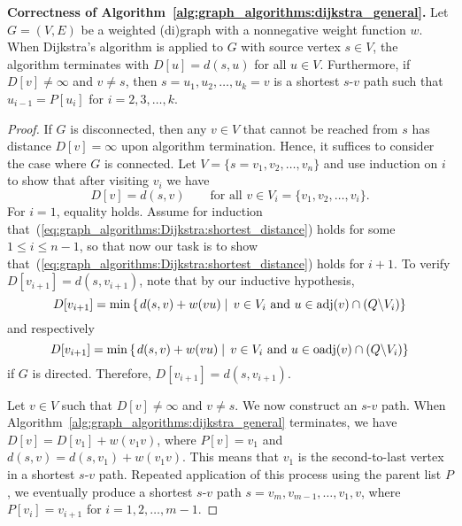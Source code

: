 \begin{theorem}
\textbf{Correctness of
  Algorithm~\ref{alg:graph_algorithms:dijkstra_general}.}
Let $G = (V, E)$ be a weighted (di)graph with a nonnegative weight
function $w$. When Dijkstra's algorithm is applied to $G$ with source
vertex $s \in V$, the algorithm terminates with $D[u] = d(s,u)$ for
all $u \in V$. Furthermore, if $D[v] \neq \infty$ and $v \neq s$, then
$s=u_1, u_2, \dots, u_k = v$ is a shortest $s$-$v$ path such that 
$u_{i-1} = P[u_i]$ for $i = 2,3,\dots,k$.
\end{theorem}

\begin{proof}
If $G$ is disconnected, then any $v \in V$ that cannot be reached from
$s$ has distance $D[v] = \infty$ upon algorithm termination. Hence, it
suffices to consider the case where $G$ is connected. Let 
$V = \{s=v_1, v_2, \dots, v_n\}$ and use induction on $i$ to show that
after visiting $v_i$ we have
%
\begin{equation}
\label{eq:graph_algorithms:Dijkstra:shortest_distance}
D[v]
=
d(s,v)
\qquad
\text{for all $v \in V_i = \{v_1, v_2, \dots, v_i\}$}.
\end{equation}
%
For $i = 1$, equality holds. Assume for induction
that~(\ref{eq:graph_algorithms:Dijkstra:shortest_distance}) holds for
some $1 \leq i \leq n - 1$, so that now our task is to show
that~(\ref{eq:graph_algorithms:Dijkstra:shortest_distance}) holds for
$i + 1$. To verify $D[v_{i+1}] = d(s, v_{i+1})$, note that by our
inductive hypothesis,
\[
D[v_{i+1}]
=
\min \left\{
\left. d(s,v) + w(vu) \;\right|\;
v \in V_i \text{ and } u \in \operatorname*{adj}(v) \cap (Q \backslash V_i)
\right\}
\]
and respectively
\[
D[v_{i+1}]
=
\min \left\{
\left. d(s,v) + w(vu) \;\right|\;
v \in V_i \text{ and } u \in \operatorname*{oadj}(v) \cap (Q \backslash V_i)
\right\}
\]
if $G$ is directed. Therefore, $D[v_{i+1}] = d(s, v_{i+1})$.

Let $v \in V$ such that $D[v] \neq \infty$ and $v \neq s$. We now
construct an $s$-$v$ path. When
Algorithm~\ref{alg:graph_algorithms:dijkstra_general} terminates, we
have $D[v] = D[v_1] + w(v_1 v)$, where $P[v] = v_1$ and 
$d(s,v) = d(s, v_1) + w(v_1 v)$. This means that $v_1$ is the
second-to-last vertex in a shortest $s$-$v$ path. Repeated application
of this process using the parent list $P$, we eventually produce a
shortest $s$-$v$ path $s=v_m, v_{m-1}, \dots, v_1, v$, where 
$P[v_i] = v_{i+1}$ for $i = 1, 2, \dots, m - 1$.
\end{proof}



